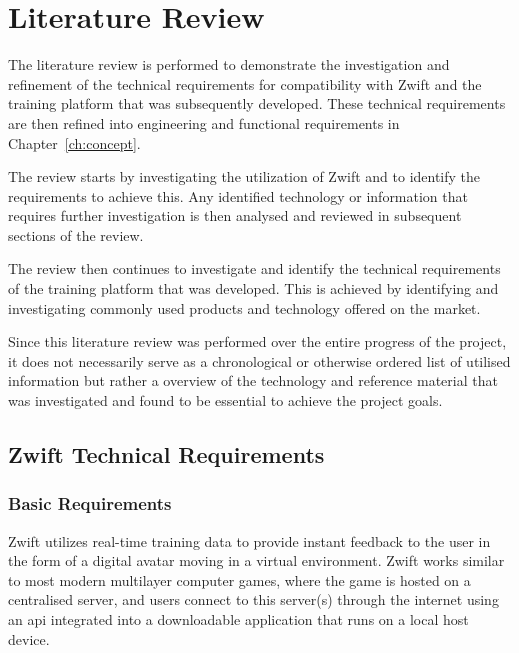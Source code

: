 
\chapter{Literature Review}
\label{sec:lit}


The literature review is performed to demonstrate the investigation and refinement of the technical requirements for compatibility with Zwift and the training platform that was subsequently developed. These technical requirements are then refined into engineering and functional requirements in Chapter~\ref{ch:concept}.

The review starts by investigating the utilization of Zwift and to identify the requirements to achieve this. Any identified technology or information that requires further investigation is then analysed and reviewed in subsequent sections of the review.

The review then continues to investigate and identify the technical requirements of the training platform that was developed. This is achieved by identifying and investigating commonly used products and technology offered on the market.

Since this literature review was performed over the entire progress of the project, it does not necessarily serve as a chronological or otherwise ordered list of utilised information but rather a overview of the technology and reference material that was investigated and found to be essential to achieve the project goals.

\section{Zwift Technical Requirements}

\subsection{Basic Requirements}
Zwift utilizes real-time training data to provide instant feedback to the user in the form of a digital avatar moving in a virtual environment. Zwift works similar to most modern multilayer computer games, where the game is hosted on a centralised server, and users connect to this server(s) through the internet using an \ac{api} integrated into a downloadable application that runs on a local host device.

